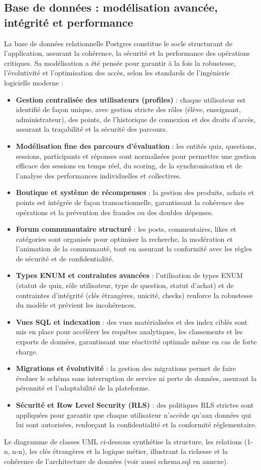 \documentclass[a4paper,11pt]{report}
\begin{document}
\subsection{Base de données : modélisation avancée, intégrité et performance}
La base de données relationnelle Postgres constitue le socle structurant de l'application, assurant la cohérence, la sécurité et la performance des opérations critiques. Sa modélisation a été pensée pour garantir à la fois la robustesse, l'évolutivité et l'optimisation des accès, selon les standards de l'ingénierie logicielle moderne :
\begin{itemize}
    \item \textbf{Gestion centralisée des utilisateurs (profiles)} : chaque utilisateur est identifié de façon unique, avec gestion stricte des rôles (élève, enseignant, administrateur), des points, de l'historique de connexion et des droits d'accès, assurant la traçabilité et la sécurité des parcours.
    \item \textbf{Modélisation fine des parcours d'évaluation} : les entités quiz, questions, sessions, participants et réponses sont normalisées pour permettre une gestion efficace des sessions en temps réel, du scoring, de la synchronisation et de l'analyse des performances individuelles et collectives.
    \item \textbf{Boutique et système de récompenses} : la gestion des produits, achats et points est intégrée de façon transactionnelle, garantissant la cohérence des opérations et la prévention des fraudes ou des doubles dépenses.
    \item \textbf{Forum communautaire structuré} : les posts, commentaires, likes et catégories sont organisés pour optimiser la recherche, la modération et l'animation de la communauté, tout en assurant la conformité avec les règles de sécurité et de confidentialité.
    \item \textbf{Types ENUM et contraintes avancées} : l'utilisation de types ENUM (statut de quiz, rôle utilisateur, type de question, statut d'achat) et de contraintes d'intégrité (clés étrangères, unicité, checks) renforce la robustesse du modèle et prévient les incohérences.
    \item \textbf{Vues SQL et indexation} : des vues matérialisées et des index ciblés sont mis en place pour accélérer les requêtes analytiques, les classements et les exports de données, garantissant une réactivité optimale même en cas de forte charge.
    \item \textbf{Migrations et évolutivité} : la gestion des migrations permet de faire évoluer le schéma sans interruption de service ni perte de données, assurant la pérennité et l'adaptabilité de la plateforme.
    \item \textbf{Sécurité et Row Level Security (RLS)} : des politiques RLS strictes sont appliquées pour garantir que chaque utilisateur n'accède qu'aux données qui lui sont autorisées, renforçant la confidentialité et la conformité réglementaire.
\end{itemize}
Le diagramme de classes UML ci-dessous synthétise la structure, les relations (1-n, n-n), les clés étrangères et la logique métier, illustrant la richesse et la cohérence de l'architecture de données (voir aussi schema.sql en annexe).
\end{document}
